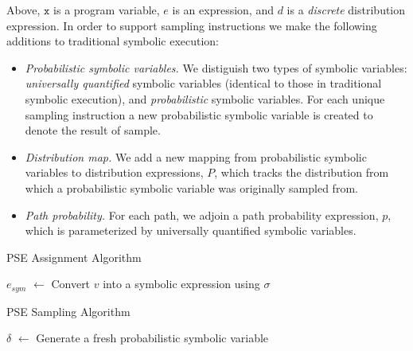 \documentclass[acmsmall]{acmart}\settopmatter{}
\newcommand*\Let[2]{\State #1 $\gets$ #2}
\begin{document}
	Above, $\mathtt{x}$ is a program variable, $e$ is an expression, and $d$ is a \textit{discrete} distribution expression. 
	In order to support sampling instructions we make the following additions to traditional symbolic execution:
	\begin{itemize}
		\item \textit{Probabilistic symbolic variables.} We distiguish two types of symbolic variables: \textit{universally quantified} symbolic variables (identical to those in traditional symbolic execution), and \textit{probabilistic} symbolic variables.
		For each unique sampling instruction a new probabilistic symbolic variable is created to denote the result of sample.
		\item \textit{Distribution map.} We add a new mapping from probabilistic symbolic variables to distribution expressions, $P$, which tracks the distribution from which a probabilistic symbolic variable was originally sampled from.
		\item \textit{Path probability.} For each path, we adjoin a path probability expression, $p$, which is parameterized by universally quantified symbolic variables.
	\end{itemize}
	
	\begin{algorithm}[H]
		\caption{PSE Assignment Algorithm}
		\begin{algorithmic}[1]
			\Let{$e_{sym}$}{Convert $v$ into a symbolic expression using $\sigma$}
			\State{}
			\EndFunction
		\end{algorithmic}
	\end{algorithm}
	
	
	\begin{algorithm}
		\caption{PSE Sampling Algorithm}
		\label{alg:sample}
		\begin{algorithmic}[1]
			\Let{$\delta$}{Generate a fresh probabilistic symbolic variable}
			\State{$\sigma[\mathtt{x}] = \delta$}
			\State{}
			\EndFunction
		\end{algorithmic}
	\end{algorithm}
	
\end{document}
